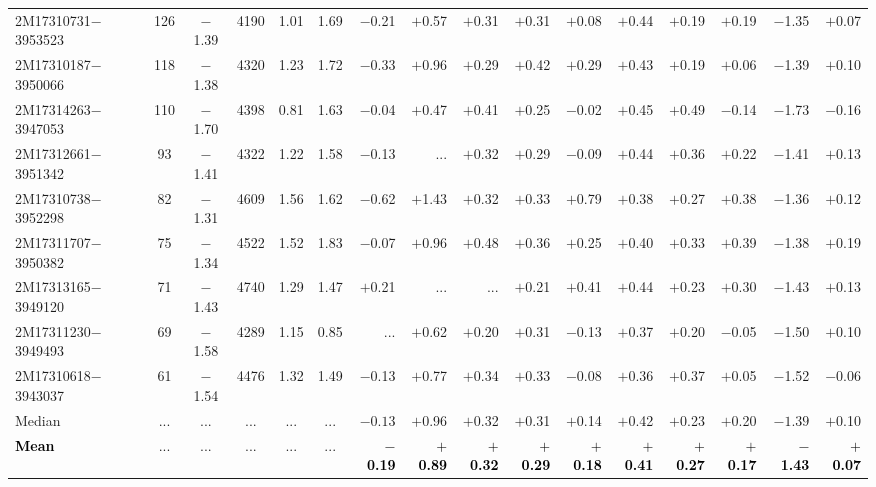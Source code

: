 \documentclass[longauth]{aa} %
\begin{document}
\begin{table*}
\begin{small}
\begin{center}
\begin{tabular}{lcccccrrrrrrrrrr}
				2M17310731$-$3953523 &  126  &  $-$1.39 &  4190  &  1.01 &  1.69  & $-$0.21 &   $+$0.57 &   $+$0.31 &   $+$0.31 &     $+$0.08 &   $+$0.44 &  $+$0.19 &    $+$0.19 &  $-$1.35  &    $+$0.07 \\
				2M17310187$-$3950066 &  118  &  $-$1.38 &  4320  &  1.23 &  1.72  & $-$0.33 &   $+$0.96 &   $+$0.29 &   $+$0.42 &     $+$0.29 &   $+$0.43 &  $+$0.19 &    $+$0.06 &  $-$1.39  &    $+$0.10 \\
				2M17314263$-$3947053 &  110  &  $-$1.70 &  4398  &  0.81 &  1.63  & $-$0.04 &   $+$0.47 &   $+$0.41 &   $+$0.25 &     $-$0.02 &   $+$0.45 &  $+$0.49 & $-$0.14 &  $-$1.73  & $-$0.16\\
				2M17312661$-$3951342 &   93  &  $-$1.41 &  4322  &  1.22 &  1.58  & $-$0.13   &    ...             &   $+$0.32 &   $+$0.29 &     $-$0.09 &   $+$0.44 &  $+$0.36 &    $+$0.22 &  $-$1.41  &    $+$0.13 \\
				2M17310738$-$3952298 &   82  &  $-$1.31 &  4609  &  1.56 &  1.62  & $-$0.62   &   $+$1.43 &   $+$0.32 &   $+$0.33 &     $+$0.79 &   $+$0.38 &  $+$0.27 &    $+$0.38 &  $-$1.36  &    $+$0.12 \\
				2M17311707$-$3950382 &   75  &  $-$1.34 &  4522  &  1.52 &  1.83  & $-$0.07   &   $+$0.96 &   $+$0.48 &   $+$0.36 &     $+$0.25 &   $+$0.40 &  $+$0.33 &    $+$0.39 &  $-$1.38  &    $+$0.19 \\
				2M17313165$-$3949120 &   71  &  $-$1.43 &  4740  &  1.29 &  1.47  & $+$0.21  &    ...             &   ...              &   $+$0.21 &     $+$0.41 &   $+$0.44 &  $+$0.23 &    $+$0.30 &  $-$1.43  &    $+$0.13 \\
				2M17311230$-$3949493 &   69  &  $-$1.58 &  4289  &  1.15 &  0.85  &     ...           &   $+$0.62 &   $+$0.20 &   $+$0.31 &     $-$0.13 &   $+$0.37 &  $+$0.20 & $-$0.05 &  $-$1.50  &    $+$0.10 \\
				2M17310618$-$3943037 &   61 &  $-$1.54 &  4476  &  1.32 &  1.49  & $-$0.13    &   $+$0.77 &   $+$0.34 &   $+$0.33 &     $-$0.08 &   $+$0.36 &  $+$0.37 & $+$0.05 &  $-$1.52  & $-$0.06 \\	
				\hline
				Median              & ... & ...  &  ... & ...   & ...  & $-0.13$  &  $+$0.96  & $+$0.32 & $+$0.31 &  $+$0.14  &$+$0.42 & $+$0.23  & $+$0.20  & $-1.39$ & $+$0.10 \\ 
				\rowcolor{pink}
			\textcolor{black}{\bf Mean}                  & ...  & ...  & ...  & ...   & ...  & \textcolor{black}{\bf $-$0.19}  & \textcolor{black}{ \bf $+$0.89} &  \textcolor{black}{\bf $+$0.32} & \textcolor{black}{\bf $+$0.29}  & \textcolor{black}{\bf $+$0.18} & \textcolor{black}{\bf $+$0.41}  & \textcolor{black}{\bf $+$0.27}  & \textcolor{black}{\bf $+$0.17} & \textcolor{black}{\bf  $-$1.43}  & \textcolor{black}{\bf  $+$0.07} \\ 

\end{tabular}
\end{center}
\end{small}
\end{table*}
\end{document}
